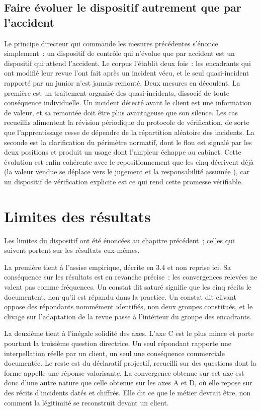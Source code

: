 \subsection{Faire évoluer le dispositif autrement que par l'accident}

Le principe directeur qui commande les mesures précédentes s'énonce simplement~: un dispositif
de contrôle qui n'évolue que par accident est un dispositif qui attend l'accident. Le corpus
l'établit deux fois~: les encadrants qui ont modifié leur revue l'ont fait après un incident
vécu, et le seul quasi-incident rapporté par un junior n'est jamais remonté. Deux mesures en
découlent. La première est un traitement organisé des quasi-incidents, dissocié de toute
conséquence individuelle. Un incident détecté avant le client est une information de valeur,
et sa remontée doit être plus avantageuse que son silence. Les cas recueillis alimentent la
révision périodique du protocole de vérification, de sorte que l'apprentissage cesse de
dépendre de la répartition aléatoire des incidents. La seconde est la clarification du
périmètre normatif, dont le flou est signalé par les deux positions et produit un usage dont
l'ampleur échappe au cabinet. Cette évolution est enfin cohérente avec le repositionnement que
les cinq décrivent déjà (la valeur vendue se déplace vers le jugement et la responsabilité
assumée \cite{suchman1995}), car un dispositif de vérification explicite est ce qui rend
cette promesse vérifiable.

\section{Limites des résultats}

Les limites du dispositif ont été énoncées au chapitre précédent~; celles qui suivent portent
sur les résultats eux-mêmes.

La première tient à l'assise empirique, décrite en 3.4 et non reprise ici. Sa conséquence
sur les résultats est en revanche précise~: les convergences relevées ne valent pas comme
fréquences. Un constat dit saturé signifie que les cinq récits le documentent, non qu'il
est répandu dans la practice. Un constat dit clivant oppose des répondants nommément
identifiés, non deux groupes constitués, et le clivage sur l'adaptation de la revue passe à
l'intérieur du groupe des encadrants.

La deuxième tient à l'inégale solidité des axes. L'axe C est le plus mince et porte pourtant
la troisième question directrice. Un seul répondant rapporte une interpellation réelle par un
client, un seul une conséquence commerciale documentée. Le reste est du déclaratif projectif,
recueilli sur des questions dont la forme appelle une réponse valorisante. La convergence
obtenue sur cet axe est donc d'une autre nature que celle obtenue sur les axes A et D, où elle
repose sur des récits d'incidents datés et chiffrés. Elle dit ce que le métier devrait être,
non comment la légitimité se reconstruit devant un client.

